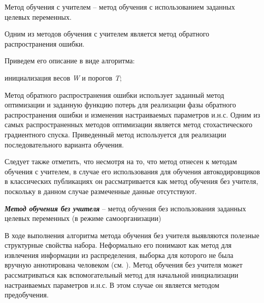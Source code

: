 Метод обучения с учителем -- метод обучения с использованием заданных целевых переменных.

Одним из методов обучения с учителем является метод обратного распространения ошибки.

Приведем его описание в виде алгоритма:

\begin{algorithm}[H]
	инициализация весов \textit{W} и порогов \textit{T};\\
\end{algorithm}

Метод обратного распространения ошибки использует заданный метод оптимизации и заданную функцию потерь для реализации фазы обратного распространения ошибки и изменения настраиваемых параметров и.н.с. Одним из самых распространенных методов оптимизации является метод стохастического градиентного спуска. Приведенный метод используется для реализации последовательного варианта обучения.

Следует также отметить, что несмотря на то, что метод отнесен к методам обучения с учителем, в случае
его использования для обучения автокодировщиков в классических публикациях он рассматривается как
метод обучения без учителя, поскольку в данном случае размеченные данные отсутствуют.

\textbf{\textit{Метод обучения без учителя}} -- метод обучения без использования заданных целевых переменных (в режиме самоорганизации)

В ходе выполнения алгоритма метода обучения без учителя выявляются полезные структурные свойства
набора. Неформально его понимают как метод для извлечения информации из распределения, выборка для которого
не была вручную аннотирована человеком (см. ). Метод обучения без учителя может рассматриваться как вспомогательный метод для начальной инициализации настраиваемых параметров и.н.с. В этом случае он является методом предобучения.

